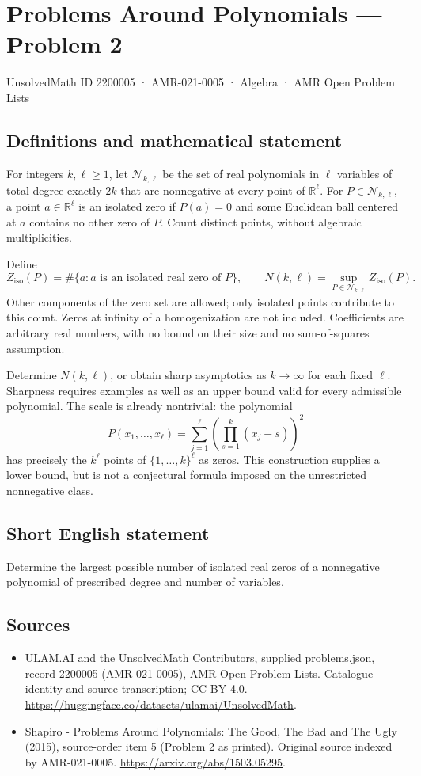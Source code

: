 \documentclass[11pt,a4paper]{article}
\begin{document}
\section*{Problems Around Polynomials — Problem 2}\label{2200005}
{\small UnsolvedMath ID 2200005 · AMR-021-0005 · Algebra · AMR Open Problem Lists}
\subsection{Definitions and mathematical statement}
For integers $k,\ell\geq1$, let $\mathcal N_{k,\ell}$ be the set of real
polynomials in $\ell$ variables of total degree exactly $2k$ that are
nonnegative at every point of $\mathbb R^\ell$. For $P\in\mathcal N_{k,\ell}$,
a point $a\in\mathbb R^\ell$ is an isolated zero if $P(a)=0$ and some
Euclidean ball centered at $a$ contains no other zero of $P$. Count
distinct points, without algebraic multiplicities.

Define
\[
 Z_{\mathrm{iso}}(P)=\#\{a:a\text{ is an isolated real zero of }P\},
 \qquad
 N(k,\ell)=\sup_{P\in\mathcal N_{k,\ell}}Z_{\mathrm{iso}}(P).
\]
Other components of the zero set are allowed; only isolated points
contribute to this count. Zeros at infinity of a homogenization are
not included. Coefficients are arbitrary real numbers, with no bound
on their size and no sum-of-squares assumption.

Determine $N(k,\ell)$, or obtain sharp asymptotics as $k\to\infty$ for
each fixed $\ell$. Sharpness requires examples as well as an upper
bound valid for every admissible polynomial. The scale is already
nontrivial: the polynomial
\[
 P(x_1,\ldots,x_\ell)=\sum_{j=1}^{\ell}
       \left(\prod_{s=1}^{k}(x_j-s)\right)^2
\]
has precisely the $k^\ell$ points of $\{1,\ldots,k\}^{\ell}$ as zeros.
This construction supplies a lower bound, but is not a conjectural
formula imposed on the unrestricted nonnegative class.
\subsection{Short English statement}
Determine the largest possible number of isolated real zeros of a nonnegative polynomial of prescribed degree and number of variables.
\subsection{Sources}
\begin{itemize}
\item[S1] ULAM.AI and the UnsolvedMath Contributors, supplied problems.json, record 2200005 (AMR-021-0005), AMR Open Problem Lists. Catalogue identity and source transcription; CC BY 4.0.
\url{https://huggingface.co/datasets/ulamai/UnsolvedMath}.
\item[S2] Shapiro - Problems Around Polynomials: The Good, The Bad and The Ugly (2015), source-order item 5 (Problem 2 as printed). Original source indexed by AMR-021-0005.
\url{https://arxiv.org/abs/1503.05295}.
\end{itemize}
\end{document}
